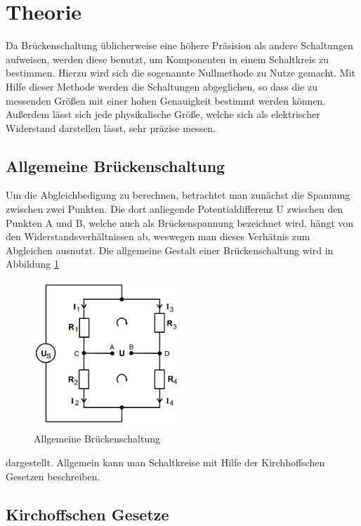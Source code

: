 \section{Theorie}
\label{sec:Theorie}
Da Brückenschaltung üblicherweise eine höhere Präsision als andere Schaltungen aufweisen, werden diese benutzt, um Komponenten in einem Schaltkreis zu bestimmen. 
Hierzu wird sich die sogenannte Nullmethode zu Nutze gemacht. 
Mit Hilfe dieser Methode werden die Schaltungen abgeglichen, so dass die zu messenden Größen mit einer hohen Genauigkeit bestimmt werden können. 
Außerdem lässt sich jede physikalische Größe, welche sich als elektrischer Widerstand darstellen lässt, sehr präzise messen.
\subsection{Allgemeine Brückenschaltung}
Um die Abgleichbedigung zu berechnen, betrachtet man zunächst die Spannung zwischen zwei Punkten. Die dort anliegende Potentialdifferenz U
zwischen den Punkten A und B, welche auch als Brückenspannung bezeichnet wird, hängt von den Widerstandsverhältnissen ab,
weswegen man dieses Verhätnis zum Abgleichen ausnutzt.
Die allgemeine Gestalt einer Brückenschaltung wird in  Abbildung \ref{fig:allgBrücke}
\begin{figure}
    \centering
    \caption{Allgemeine Brückenschaltung} 
    \label{fig:allgBrücke}
    \includegraphics[width = 0.5\textwidth]{bridges/genbridge.png}
\end{figure}
dargestellt. Allgemein kann man Schaltkreise mit Hilfe der Kirchhoffschen Gesetzen beschreiben.
\subsection{Kirchoffschen Gesetze}
